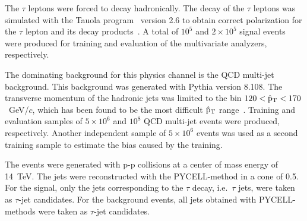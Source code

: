 \documentclass[a4paper]{jpconf}
\begin{document}

The $\tau$ leptons were forced to decay hadronically. The decay of the
$\tau$ leptons was simulated with the Tauola program~\cite{tauola}
version 2.6 to obtain correct polarization for the $\tau$ lepton and
its decay products~\cite{taupolarization}. 
A total of $10^5$ and $2\times 10^5$ signal events were produced for training and evaluation of the
multivariate analyzers, respectively.

The dominating background for this physics channel is the QCD
multi-jet background. This background was generated with 
Pythia version 8.108. The transverse momentum of the hadronic jets was
limited to the bin $120 < \hat{\rm p}_{\rm T} < 170$~GeV/$c$, which
has been found to be the most difficult $\hat{\rm p}_{\rm T}$
range~\cite{ptdrII}. Training and evaluation samples of $5\times 10^6$
and $10^8$ QCD multi-jet events were produced, respectively. 
Another independent sample of $5\times 10^6$ events was used as a second
training sample to estimate the bias caused by the training.

The events were generated with p-p collisions at a center of mass energy
of 14~TeV. The jets were reconstructed with the PYCELL-method in a
cone of 0.5. For the signal, only the jets
corresponding to the $\tau$ decay, i.e.~$\tau$ jets, 
were taken as $\tau$-jet candidates. 
For the background events, all jets obtained with PYCELL-methods were taken as $\tau$-jet candidates.
\end{document}
